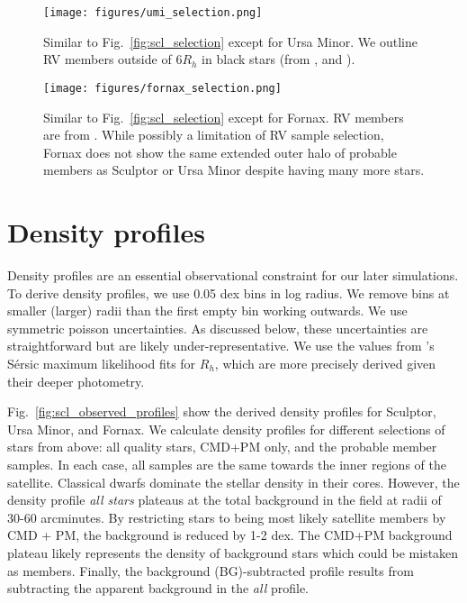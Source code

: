 \begin{figure}
\centering
\texttt{[image: figures/umi\_selection.png]}
\caption[Ursa Minor sample selection]{Similar to
Fig.~\ref{fig:scl_selection} except for Ursa Minor. We outline RV
members outside of \(6R_h\) in black stars (from \citet{sestito+2023b},
\citet{pace+2020} and \citet{spencer+2018}).}\label{fig:umi_selection}
\end{figure}

\begin{figure}
\centering
\texttt{[image: figures/fornax\_selection.png]}
\caption[Fornax sample selection]{Similar to
Fig.~\ref{fig:scl_selection} except for Fornax. RV members are from
\citet{WMO2009}. While possibly a limitation of RV sample selection,
Fornax does not show the same extended outer halo of probable members as
Sculptor or Ursa Minor despite having many more
stars.}\label{fig:fornax_selection}
\end{figure}

\section{Density profiles}\label{density-profiles}

Density profiles are an essential observational constraint for our later
simulations. To derive density profiles, we use 0.05 dex bins in log
radius. We remove bins at smaller (larger) radii than the first empty
bin working outwards. We use symmetric poisson uncertainties. As
discussed below, these uncertainties are straightforward but are likely
under-representative. We use the values from \citet{munoz+2018}'s Sérsic
maximum likelihood fits for \(R_h\), which are more precisely derived
given their deeper photometry.

Fig.~\ref{fig:scl_observed_profiles} show the derived density profiles
for Sculptor, Ursa Minor, and Fornax. We calculate density profiles for
different selections of stars from above: all quality stars, CMD+PM
only, and the probable member samples. In each case, all samples are the
same towards the inner regions of the satellite. Classical dwarfs
dominate the stellar density in their cores. However, the density
profile \emph{all stars} plateaus at the total background in the field
at radii of 30-60 arcminutes. By restricting stars to being most likely
satellite members by CMD + PM, the background is reduced by 1-2 dex. The
CMD+PM background plateau likely represents the density of background
stars which could be mistaken as members. Finally, the background
(BG)-subtracted profile results from subtracting the apparent background
in the \emph{all} profile.

